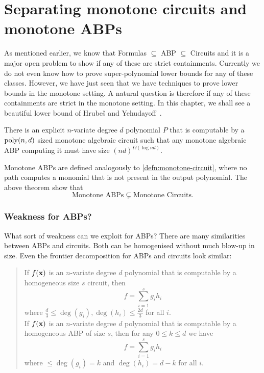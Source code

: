 \chapter{Separating monotone circuits and monotone ABPs}\label{chap:monABPCktSep}

\newcommand{\MonChi}{\operatorname{Mon}}
\newcommand{\EIP}{\operatorname{EIP}}

As mentioned earlier, we know that Formulas $\subseteq$ ABP $\subseteq$ Circuits and it is a major open problem to show if any of these are strict containments.
Currently we do not even know how to prove super-polynomial lower bounds for any of these classes.
However, we have just seen that we have techniques to prove lower bounds in the monotone setting.
A natural question is therefore if any of these containments are strict in the monotone setting. In this chapter, we shall see a beautiful lower bound of Hrube\v{s} and Yehudayoff~\cite{HY16}.

\begin{theorem}\label{thm:mon-abp-ckt-sep}
  There is an explicit $n$-variate degree $d$ polynomial $P$ that is computable by a $\operatorname{poly}(n,d)$ sized monotone algebraic circuit such that any monotone algebraic ABP computing it must have size $(nd)^{\Omega(\log nd)}$. 
\end{theorem}

Monotone ABPs are defined analogously to \autoref{defn:monotone-circuit}, where no path computes a monomial that is not present in the output polynomial. The above theorem show that
  \[
    \text{Monotone ABPs} \subsetneq \text{Monotone Circuits}.
  \]

\subsection*{Weakness for ABPs?}

What sort of weakness can we exploit for ABPs? There are many similarities between ABPs and circuits. Both can be homogenised without much blow-up in size. Even the frontier decomposition for ABPs and circuits look similar:
\begin{quote}
  If $f(\mathbf{x})$ is an $n$-variate degree $d$ polynomial that is computable by a homogeneous size $s$ circuit, then
  \[
    f = \sum_{i=1}^s g_i h_i
  \]
  where $\frac{d}{3} \leq \deg(g_i),\deg(h_i) \leq \frac{2d}{3}$ for all $i$.\\ 

  If $f(\mathbf{x})$ is an $n$-variate degree $d$ polynomial that is computable by a homogeneous ABP of size $s$, then for any $0\leq k \leq d$ we have
  \[
    f = \sum_{i=1}^s g_i h_i
  \]
  where $\leq \deg(g_i) = k$ and $\deg(h_i) =  d-k$ for all $i$.
\end{quote}

